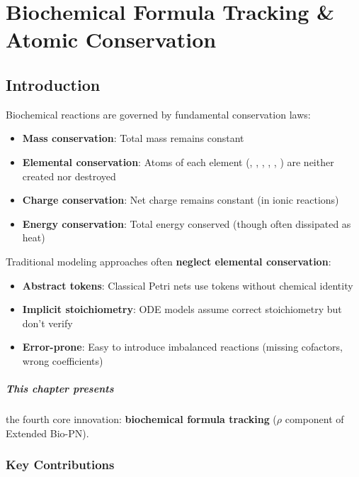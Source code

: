 \chapter{Biochemical Formula Tracking \& Atomic Conservation}
\label{ch:biochemical-formulas}

\section{Introduction}
\label{sec:formula-tracking-intro}

Biochemical reactions are governed by fundamental conservation laws:
\begin{itemize}
    \item \textbf{Mass conservation}: Total mass remains constant
    \item \textbf{Elemental conservation}: Atoms of each element (, , , , , ) are neither created nor destroyed
    \item \textbf{Charge conservation}: Net charge remains constant (in ionic reactions)
    \item \textbf{Energy conservation}: Total energy conserved (though often dissipated as heat)
\end{itemize}

Traditional modeling approaches often \textbf{neglect elemental conservation}:
\begin{itemize}
    \item \textbf{Abstract tokens}: Classical Petri nets use tokens without chemical identity
    \item \textbf{Implicit stoichiometry}: ODE models assume correct stoichiometry but don't verify
    \item \textbf{Error-prone}: Easy to introduce imbalanced reactions (missing cofactors, wrong coefficients)
\end{itemize}

\paragraph{This chapter presents} the fourth core innovation: \textbf{biochemical formula tracking} ($\rho$ component of Extended Bio-PN).

\subsection{Key Contributions}
\label{subsec:formula-key-contributions}


